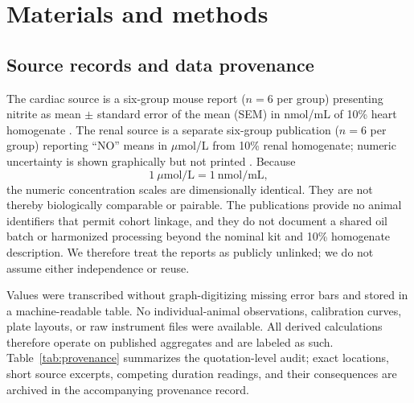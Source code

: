 \documentclass[11pt]{article}
\begin{document}
\section{Materials and methods}

\subsection{Source records and data provenance}

The cardiac source is a six-group mouse report ($n=6$ per group) presenting nitrite as mean $\pm$ standard error of the mean (SEM) in nmol/mL of 10\% heart homogenate \citep{rajpoot2025}. The renal source is a separate six-group publication ($n=6$ per group) reporting ``NO'' means in $\mu$mol/L from 10\% renal homogenate; numeric uncertainty is shown graphically but not printed \citep{sharma2024}. Because
\[
1\ \mu\mathrm{mol/L}=1\ \mathrm{nmol/mL},
\]
the numeric concentration scales are dimensionally identical. They are not thereby biologically comparable or pairable. The publications provide no animal identifiers that permit cohort linkage, and they do not document a shared oil batch or harmonized processing beyond the nominal kit and 10\% homogenate description. We therefore treat the reports as publicly unlinked; we do not assume either independence or reuse.

Values were transcribed without graph-digitizing missing error bars and stored in a machine-readable table. No individual-animal observations, calibration curves, plate layouts, or raw instrument files were available. All derived calculations therefore operate on published aggregates and are labeled as such. Table~\ref{tab:provenance} summarizes the quotation-level audit; exact locations, short source excerpts, competing duration readings, and their consequences are archived in the accompanying provenance record.
\end{document}
